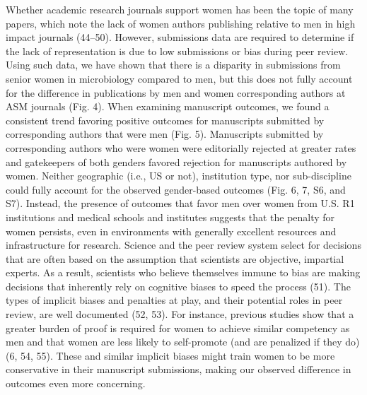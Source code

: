 \documentclass[11pt,]{article}
\begin{document}
Whether academic research journals support women has been the topic of
many papers, which note the lack of women authors publishing relative to
men in high impact journals (44--50). However, submissions data are
required to determine if the lack of representation is due to low
submissions or bias during peer review. Using such data, we have shown
that there is a disparity in submissions from senior women in
microbiology compared to men, but this does not fully account for the
difference in publications by men and women corresponding authors at ASM
journals (Fig. 4). When examining manuscript outcomes, we found a
consistent trend favoring positive outcomes for manuscripts submitted by
corresponding authors that were men (Fig. 5). Manuscripts submitted by
corresponding authors who were women were editorially rejected at
greater rates and gatekeepers of both genders favored rejection for
manuscripts authored by women. Neither geographic (i.e., US or not),
institution type, nor sub-discipline could fully account for the
observed gender-based outcomes (Fig. 6, 7, S6, and S7). Instead, the
presence of outcomes that favor men over women from U.S. R1 institutions
and medical schools and institutes suggests that the penalty for women
persists, even in environments with generally excellent resources and
infrastructure for research. Science and the peer review system select
for decisions that are often based on the assumption that scientists are
objective, impartial experts. As a result, scientists who believe
themselves immune to bias are making decisions that inherently rely on
cognitive biases to speed the process (51). The types of implicit biases
and penalties at play, and their potential roles in peer review, are
well documented (52, 53). For instance, previous studies show that a
greater burden of proof is required for women to achieve similar
competency as men and that women are less likely to self-promote (and
are penalized if they do) (6, 54, 55). These and similar implicit biases
might train women to be more conservative in their manuscript
submissions, making our observed difference in outcomes even more
concerning.
\end{document}
